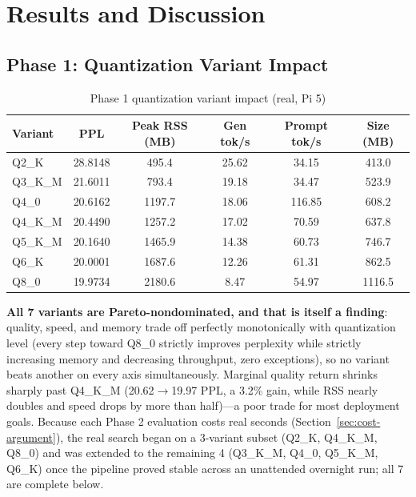 \documentclass[conference, letterpaper]{IEEEtran}
\begin{document}
\section{Results and Discussion}
\label{sec:results}

\subsection{Phase 1: Quantization Variant Impact}
\label{sec:phase1-results}

\begin{table}[t]
\caption{Phase 1 quantization variant impact (real, Pi 5)}
\label{tab:phase1-impact}
\centering
\footnotesize
\begin{tabular}{@{}lccccc@{}}
\toprule
Variant & PPL & Peak RSS (MB) & Gen tok/s & Prompt tok/s & Size (MB) \\
\midrule
Q2\_K    & 28.8148 & 495.4  & 25.62 & 34.15  & 413.0 \\
Q3\_K\_M & 21.6011 & 793.4  & 19.18 & 34.47  & 523.9 \\
Q4\_0    & 20.6162 & 1197.7 & 18.06 & 116.85 & 608.2 \\
Q4\_K\_M & 20.4490 & 1257.2 & 17.02 & 70.59  & 637.8 \\
Q5\_K\_M & 20.1640 & 1465.9 & 14.38 & 60.73  & 746.7 \\
Q6\_K    & 20.0001 & 1687.6 & 12.26 & 61.31  & 862.5 \\
Q8\_0    & 19.9734 & 2180.6 & 8.47  & 54.97  & 1116.5 \\
\bottomrule
\end{tabular}
\end{table}

\textbf{All 7 variants are Pareto-nondominated, and that is itself a finding}: quality, speed, and memory trade off perfectly monotonically with quantization level (every step toward Q8\_0 strictly improves perplexity while strictly increasing memory and decreasing throughput, zero exceptions), so no variant beats another on every axis simultaneously. Marginal quality return shrinks sharply past Q4\_K\_M (20.62$\to$19.97 PPL, a 3.2\% gain, while RSS nearly doubles and speed drops by more than half)---a poor trade for most deployment goals. Because each Phase 2 evaluation costs real seconds (Section~\ref{sec:cost-argument}), the real search began on a 3-variant subset (Q2\_K, Q4\_K\_M, Q8\_0) and was extended to the remaining 4 (Q3\_K\_M, Q4\_0, Q5\_K\_M, Q6\_K) once the pipeline proved stable across an unattended overnight run; all 7 are complete below.
\end{document}
